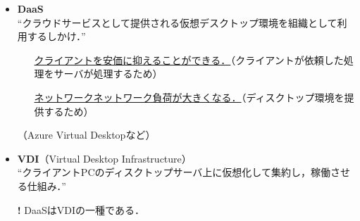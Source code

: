 \begin{frame}[t]{\fftitle}
    \begin{itemize}
        \item \textbf{DaaS}\\
              ``クラウドサービスとして提供される仮想デスクトップ環境を組織として利用するしかけ．''\hfill\cite{ISディジタル辞典DaaS}
              \begin{itemize}
                  \item[{\bfseries\Large\cmark}] \underline{クライアントを安価に抑えることができる．}（クライアントが依頼した処理をサーバが処理するため）
                  \item[{\bfseries\Large\xmark}] \underline{ネットワークネットワーク負荷が大きくなる．}（ディスクトップ環境を提供するため）
              \end{itemize}
              （Azure Virtual Desktopなど）\\
              \hrulefill
        \item \textbf{VDI}（Virtual Desktop Infrastructure）\\
              ``クライアントPCのディスクトップサーバ上に仮想化して集約し，稼働させる仕組み．''\hfill\cite{ISディジタル辞典VDI}
              \item[\textbf{\large !}]DaaSはVDIの一種である．
    \end{itemize}
\end{frame}